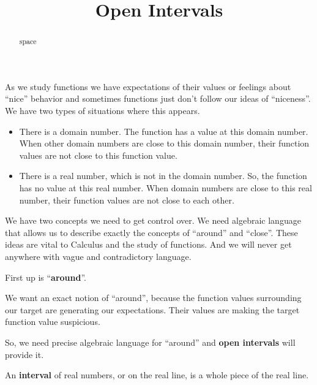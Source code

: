 \documentclass{ximera}
\title{Open Intervals}
\begin{document}
\begin{abstract}
space
\end{abstract}
\maketitle




As we study functions we have expectations of their values or feelings about ``nice'' behavior and sometimes functions just don't follow our ideas of ``niceness''.  We have two types of situations where this appears.

\begin{itemize}
\item There is a domain number. The function has a value at this domain number. When other domain numbers are close to this domain number, their function values are not close to this function value.
\item There is a real number, which is not in the domain number. So, the function has no value at this real number. When  domain numbers are close to this real number, their function values are not close to each other.
\end{itemize}


We have two concepts we need to get control over. We need algebraic language that allows us to describe exactly the concepts of ``around'' and ``close''.  These ideas are vital to Calculus and the study of functions.  And we will never get anywhere with vague and contradictory language.


First up is ``\textbf{\textcolor{purple!85!blue}{around}}''.



We want an exact notion of ``around'', because the function values surrounding our target are generating our expectations.  Their values are making the target function value suspicious.

So, we need precise algebraic language for ``around'' and \textbf{open intervals} will provide it.















An \textbf{interval} of real numbers, or on the real line, is a whole piece of the real line.
\end{document}
